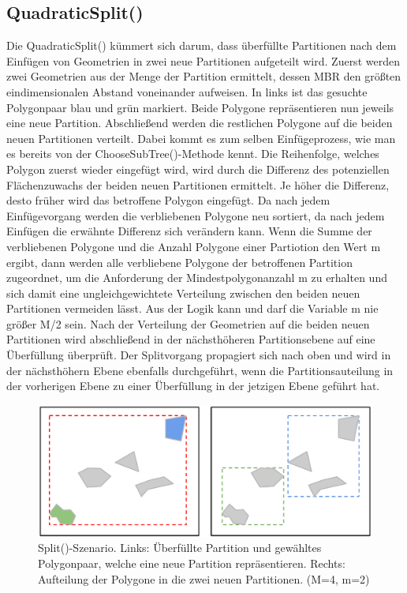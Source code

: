 \documentclass[runningheads,a4paper]{llncs}
\begin{document}
\subsection{QuadraticSplit()}
\label{sec:r-split}
Die QuadraticSplit() kümmert sich darum, dass überfüllte Partitionen nach dem Einfügen von Geometrien in zwei neue Partitionen aufgeteilt wird. Zuerst werden zwei Geometrien aus der Menge der Partition ermittelt, dessen \acs{MBR} den größten eindimensionalen Abstand voneinander aufweisen. In  links ist das gesuchte Polygonpaar blau und grün markiert. Beide Polygone repräsentieren nun jeweils eine neue Partition. Abschließend werden die restlichen Polygone auf die beiden neuen Partitionen verteilt. Dabei kommt es zum selben Einfügeprozess, wie man es bereits von der ChooseSubTree()-Methode kennt. Die Reihenfolge, welches Polygon zuerst wieder eingefügt wird, wird durch die Differenz des potenziellen Flächenzuwachs der beiden neuen Partitionen ermittelt. Je höher die Differenz, desto früher wird das betroffene Polygon eingefügt. Da nach jedem Einfügevorgang werden die verbliebenen Polygone neu sortiert, da nach jedem Einfügen die erwähnte Differenz sich verändern kann. Wenn die Summe der verbliebenen Polygone und die Anzahl Polygone einer Partiotion den Wert \acs{m} ergibt, dann werden alle verbliebene Polygone der betroffenen Partition zugeordnet, um die Anforderung der Mindestpolygonanzahl \acs{m} zu erhalten und sich damit eine ungleichgewichtete Verteilung zwischen den beiden neuen Partitionen vermeiden lässt. Aus der Logik kann und darf die Variable \acs{m} nie größer \acs{M}/2 sein. Nach der Verteilung der Geometrien auf die beiden neuen Partitionen wird abschließend in der nächsthöheren Partitionsebene auf eine Überfüllung überprüft. Der Splitvorgang propagiert sich nach oben und wird in der nächsthöhern Ebene ebenfalls durchgeführt, wenn die Partitionsauteilung in der vorherigen Ebene zu einer Überfüllung in der jetzigen Ebene geführt hat. 
\begin{figure}[H]
		\begin{center}
		\includegraphics[width=1.0\textwidth ]{003_Beispiel_Quadratic_Split_1.pdf}
		\caption{Split()-Szenario. Links: Überfüllte Partition und gewähltes Polygonpaar, welche eine neue Partition repräsentieren. Rechts: Aufteilung der Polygone in die zwei neuen Partitionen. (\acs{M}=4, \acs{m}=2)}
		\label{fig:beispiel-quadratic-split}
		\end{center}
	\end{figure}
\end{document}
